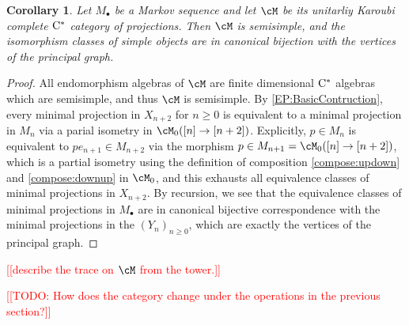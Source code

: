 \documentclass[11pt]{article}
\theoremstyle{plain}
\newtheorem{cor}[thm]{Corollary}
\theoremstyle{definition}
\newcommand{\Cstar}{\rm{C^*}}
\newcommand{\nn}[1]{\textcolor{red}{[[#1]]}}
\begin{document}
\begin{cor}
\label{cor:SemisimpleProjectionCategory}
Let $M_\bullet$ be a Markov sequence and let $\cM$ be its unitarliy Karoubi complete $\Cstar$ category of projections.
Then $\cM$ is semisimple, and the isomorphism classes of simple objects are in canonical bijection with the vertices of the principal graph.
\end{cor}
\begin{proof}
All endomorphism algebras of $\cM$ are finite dimensional $\Cstar$ algebras which are semisimple, and thus $\cM$ is semisimple. By \ref{EP:BasicContruction}, every minimal projection in $X_{n+2}$ for $n\geq 0$ is equivalent to a minimal projection in $M_{n}$ via a parial isometry in $\cM_0([n] \to [n+2])$. 
Explicitly, $p\in M_n$ is equivalent to $p e_{n+1} \in M_{n+2}$ via the morphism $p\in M_{n+1} = \cM_0([n] \to [n+2])$, which is a partial isometry using the definition of composition \ref{compose:updown} and \ref{compose:downup} in $\cM_0$, and this exhausts all equivalence classes of minimal projections in $X_{n+2}$.
By recursion, we see that the equivalence classes of minimal projections in $M_\bullet$ are in canonical bijective correspondence with the minimal projections in the $(Y_n)_{n\geq 0}$, which are exactly the vertices of the principal graph.
\end{proof}

\nn{describe the trace on $\cM$ from the tower.}

\nn{TODO: How does the category change under the operations in the previous section?}
\end{document}
